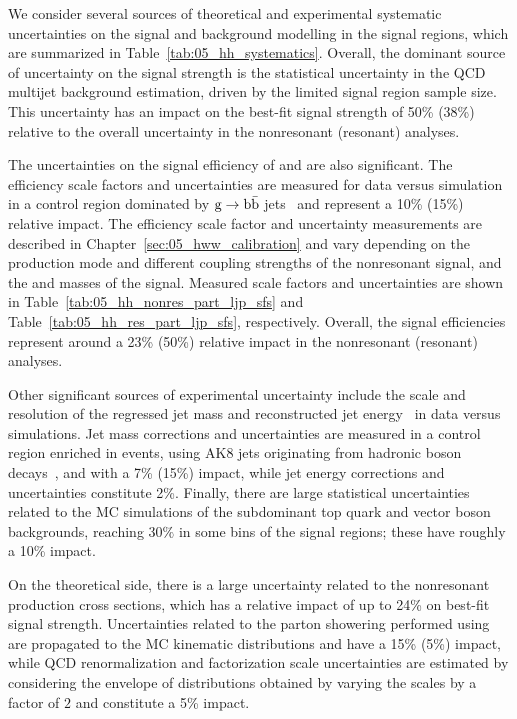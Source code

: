 We consider several sources of theoretical and experimental systematic uncertainties on the signal and background modelling in the signal regions, which are summarized in Table~\ref{tab:05_hh_systematics}.
Overall, the dominant source of uncertainty on the \HH signal strength is the statistical uncertainty in the QCD multijet background estimation, driven by the limited signal region sample size. 
This uncertainty has an impact on the best-fit signal strength of 50\% (38\%) relative to the overall uncertainty in the nonresonant (resonant) analyses.

The uncertainties on the signal efficiency of \hbb and \hvv are also significant.
The \hbb efficiency scale factors and uncertainties are measured for data versus simulation in a control region dominated by $\textrm{g}\to\textrm{b}\bar{\textrm{b}}$ jets~\cite{CMS:2023tlv} and represent a 10\% (15\%) relative impact.
The \hyvv efficiency scale factor and uncertainty measurements are described in Chapter~\ref{sec:05_hww_calibration} and vary depending on the production mode and different coupling strengths of the nonresonant \HH signal, and the \PX and \PY masses of the \XHY signal.
Measured scale factors and uncertainties are shown in Table~\ref{tab:05_hh_nonres_part_ljp_sfs} and Table~\ref{tab:05_hh_res_part_ljp_sfs}, respectively.
Overall, the \hyvv signal efficiencies represent around a 23\% (50\%) relative impact in the nonresonant (resonant) analyses.

Other significant sources of experimental uncertainty include the scale and resolution of the regressed jet mass and reconstructed jet energy~\cite{CMS-DP-2021-033} in data versus simulations.
Jet mass corrections and uncertainties are measured in a control region enriched in \ttbar events, using AK8 jets originating from hadronic \PW boson decays~\cite{CMS-PAS-B2G-21-001}, and with a 7\% (15\%) impact, while jet energy corrections and uncertainties constitute 2\%.
Finally, there are large statistical uncertainties related to the MC simulations of the subdominant top quark and vector boson backgrounds, reaching $30\%$ in some bins of the signal regions; these have roughly a 10\% impact.

On the theoretical side, there is a large uncertainty related to the nonresonant \HH production cross sections, which has a relative impact of up to 24\% on best-fit signal strength.
Uncertainties related to the parton showering performed using ~\cite{Mrenna:2016sih} are propagated to the MC kinematic distributions and have a 15\% (5\%) impact, while QCD renormalization and factorization scale uncertainties are estimated by considering the envelope of distributions obtained by varying the scales by a factor of $2$ and constitute a 5\% impact.

